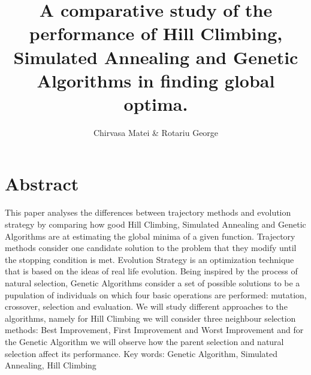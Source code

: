 \documentclass{article}
\author{Chirvasa Matei \& Rotariu George}
\title{A comparative study of the performance of Hill Climbing, Simulated Annealing and Genetic Algorithms in finding global optima.}
\begin{document}
\maketitle
\section{Abstract}
This paper analyses the differences between trajectory methods and evolution strategy by comparing how good Hill Climbing, Simulated Annealing and Genetic Algorithms are at estimating the global minima of a given function. Trajectory methods consider one candidate solution to the problem that they modify until the stopping condition is met. Evolution Strategy is an optimization technique that is based on the ideas of real life evolution. Being inspired by the process of natural selection, Genetic Algorithms consider a set of possible solutions to be a pupulation of individuals on which four basic operations are performed: mutation, crossover, selection and evaluation. We will study different approaches to the algorithms, namely for Hill Climbing we will consider three neighbour selection methods: Best Improvement, First Improvement and Worst Improvement and for the Genetic Algorithm we will observe how the parent selection and natural selection affect its performance.
Key words: Genetic Algorithm, Simulated Annealing, Hill Climbing
\end{document}
